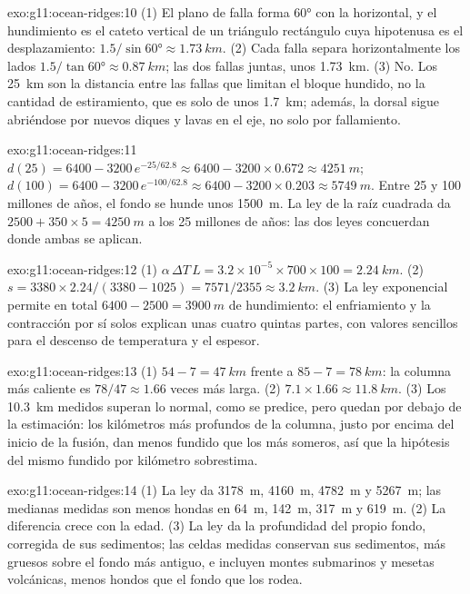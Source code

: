 \begin{solution}{exo:g11:ocean-ridges:10}
(1) El plano de falla forma \ang{60} con la horizontal, y el hundimiento es el
cateto vertical de un triángulo rectángulo cuya hipotenusa es el
desplazamiento: $1.5/\sin\ang{60} \approx \qty{1.73}{km}$. (2) Cada falla
separa horizontalmente los lados $1.5/\tan\ang{60} \approx \qty{0.87}{km}$;
las dos fallas juntas, unos \qty{1.73}{km}. (3) No. Los \qty{25}{km} son la
distancia entre las fallas que limitan el bloque hundido, no la cantidad de
estiramiento, que es solo de unos \qty{1.7}{km}; además, la dorsal sigue
abriéndose por nuevos diques y lavas en el eje, no solo por fallamiento.
\end{solution}

\begin{solution}{exo:g11:ocean-ridges:11}
$d(25) = 6400 - 3200\,e^{-25/62.8} \approx 6400 - 3200 \times 0.672 \approx
\qty{4251}{m}$; $d(100) = 6400 - 3200\,e^{-100/62.8} \approx 6400 - 3200
\times 0.203 \approx \qty{5749}{m}$. Entre 25 y 100 millones de años, el fondo
se hunde unos \qty{1500}{m}. La ley de la raíz cuadrada da
$2500 + 350 \times 5 = \qty{4250}{m}$ a los 25 millones de años: las dos
leyes concuerdan donde ambas se aplican.
\end{solution}

\begin{solution}{exo:g11:ocean-ridges:12}
(1) $\alpha\,\Delta T\,L = 3.2 \times 10^{-5} \times 700 \times 100 =
\qty{2.24}{km}$. (2) $s = 3380 \times 2.24/(3380 - 1025) = 7571/2355 \approx
\qty{3.2}{km}$. (3) La ley exponencial permite en total $6400 - 2500 =
\qty{3900}{m}$ de hundimiento: el enfriamiento y la contracción por sí solos
explican unas cuatro quintas partes, con valores sencillos para el descenso de
temperatura y el espesor.
\end{solution}

\begin{solution}{exo:g11:ocean-ridges:13}
(1) $54 - 7 = \qty{47}{km}$ frente a $85 - 7 = \qty{78}{km}$: la columna más
caliente es $78/47 \approx 1.66$ veces más larga. (2) $7.1 \times 1.66 \approx
\qty{11.8}{km}$. (3) Los \qty{10.3}{km} medidos superan lo normal, como se
predice, pero quedan por debajo de la estimación: los kilómetros más profundos
de la columna, justo por encima del inicio de la fusión, dan menos fundido que
los más someros, así que la hipótesis del mismo fundido por kilómetro
sobrestima.
\end{solution}

\begin{solution}{exo:g11:ocean-ridges:14}
(1) La ley da \qty{3178}{m}, \qty{4160}{m}, \qty{4782}{m} y
\qty{5267}{m}; las medianas medidas son menos hondas en \qty{64}{m},
\qty{142}{m}, \qty{317}{m} y \qty{619}{m}. (2) La diferencia crece con la
edad. (3) La ley da la profundidad del propio fondo, corregida de sus
sedimentos; las celdas medidas conservan sus sedimentos, más gruesos sobre el
fondo más antiguo, e incluyen montes submarinos y mesetas volcánicas, menos
hondos que el fondo que los rodea.
\end{solution}

